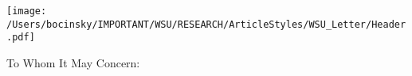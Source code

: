 \documentclass[letterpaper,11pt]{letter}
\begin{document}
\begin{letter}{}

\centerline{\texttt{[image: /Users/bocinsky/IMPORTANT/WSU/RESEARCH/ArticleStyles/WSU\_Letter/Header.pdf]}}

\opening{To Whom It May Concern:}

%
%
%


\end{letter}
\end{document}
